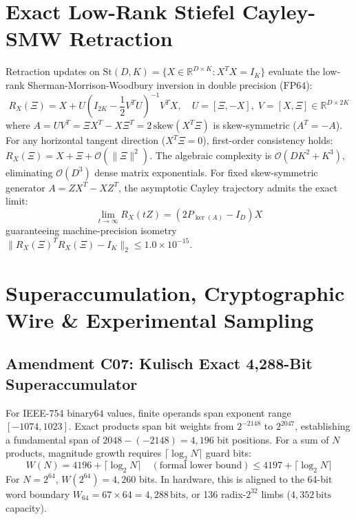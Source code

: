 \documentclass[11pt,a4paper]{article}
\begin{document}
\section{Exact Low-Rank Stiefel Cayley-SMW Retraction}
\label{sec:cayley_smw}
Retraction updates on $\mathrm{St}(D, K) = \{X \in \mathbb{R}^{D \times K} : X^T X = I_K\}$ evaluate the low-rank Sherman-Morrison-Woodbury inversion in double precision ($\text{FP64}$):
\begin{equation}
\label{eq:cayley_smw}
R_X(\Xi) = X + U \left( I_{2K} - \frac{1}{2} V^T U \right)^{-1} V^T X, \quad U = [\Xi, -X], \; V = [X, \Xi] \in \mathbb{R}^{D \times 2K}
\end{equation}
where $A = U V^T = \Xi X^T - X \Xi^T = 2\,\mathrm{skew}(X^T \Xi)$ is skew-symmetric ($A^T = -A$). For any horizontal tangent direction ($X^T \Xi = 0$), first-order consistency holds: $R_X(\Xi) = X + \Xi + \mathcal{O}(\|\Xi\|^2)$.
The algebraic complexity is $\mathcal{O}(D K^2 + K^3)$, eliminating $\mathcal{O}(D^3)$ dense matrix exponentials. For fixed skew-symmetric generator $A = Z X^T - X Z^T$, the asymptotic Cayley trajectory admits the exact limit:
\begin{equation}
\label{eq:asymptotic_limit}
\lim_{t \to \infty} R_X(t Z) = (2 P_{\ker(A)} - I_D) X
\end{equation}
guaranteeing machine-precision isometry $\|R_X(\Xi)^T R_X(\Xi) - I_K\|_2 \le 1.0 \times 10^{-15}$.

\section{Superaccumulation, Cryptographic Wire \& Experimental Sampling}
\label{sec:amendments}

\subsection{Amendment C07: Kulisch Exact 4,288-Bit Superaccumulator}
\label{subsec:c07}
For IEEE-754 $\text{binary64}$ values, finite operands span exponent range $[-1074, 1023]$. Exact products span bit weights from $2^{-2148}$ to $2^{2047}$, establishing a fundamental span of $2048 - (-2148) = 4,196$ bit positions. For a sum of $N$ products, magnitude growth requires $\lceil \log_2 N \rceil$ guard bits:
\begin{equation}
\label{eq:kulisch_width}
W(N) = 4196 + \lceil \log_2 N \rceil \quad (\text{formal lower bound}) \le 4197 + \lceil \log_2 N \rceil
\end{equation}
For $N = 2^{64}$, $W(2^{64}) = 4,260$ bits. In hardware, this is aligned to the 64-bit word boundary $W_{64} = 67 \times 64 = 4,288\,\text{bits}$, or 136 radix-$2^{32}$ limbs ($4,352\,\text{bits}$ capacity).
\end{document}
